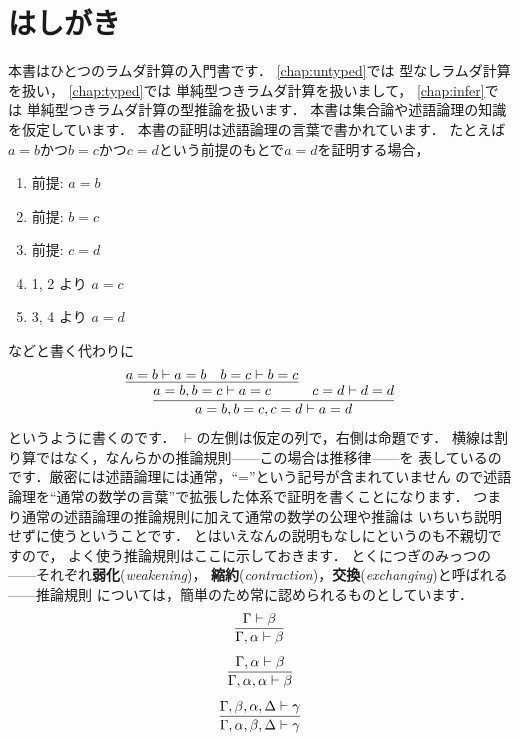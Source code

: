 \documentclass{ltjsbook}%
\newcommand\term[2]{\textbf{#1}{(\textit{#2})}}%
\begin{document}
\chapter{はしがき}%
\hspace*{1\zw}本書はひとつのラムダ計算の入門書です．%
\prechaptername\ref{chap:untyped}\postchaptername では%
型なしラムダ計算を扱い， \prechaptername\ref{chap:typed}\postchaptername では%
単純型つきラムダ計算を扱いまして，%
\prechaptername\ref{chap:infer}\postchaptername では%
単純型つきラムダ計算の型推論を扱います．%
\iffalse%
本書は集合論や述語論理の知識を仮定しています．%
本書の証明は述語論理の言葉で書かれています．%
たとえば$a=b$かつ$b=c$かつ$c=d$という前提のもとで$a=d$を証明する場合，%
\begin{enumerate}%
\item 前提: $a=b$
\item 前提: $b=c$
\item 前提: $c=d$
\item 1, 2 より $a=c$
\item 3, 4 より $a=d$
\end{enumerate}%
などと書く代わりに%
\begin{equation}%
  \infer{%
    a=b,b=c,c=d\vdash a=d%
  }{%
    \infer{%
      a=b,b=c\vdash a=c%
    }{%
      a=b\vdash a=b%
    &%
      b=c\vdash b=c%
    }%
  &%
    c=d\vdash d=d%
  }%
\end{equation}%
というように書くのです．%
$\vdash$の左側は仮定の列で，右側は命題です．%
横線は割り算ではなく，なんらかの推論規則------この場合は推移律------を%
表しているのです．厳密には述語論理には通常，``=''という記号が含まれていません%
ので述語論理を``通常の数学の言葉''で拡張した体系で証明を書くことになります．%
つまり通常の述語論理の推論規則に加えて通常の数学の公理や推論は%
いちいち説明せずに使うということです．%
とはいえなんの説明もなしにというのも不親切ですので，%
よく使う推論規則はここに示しておきます．%
とくにつぎのみっつの------それぞれ\term{弱化}{weakening}，%
\term{縮約}{contraction}，\term{交換}{exchanging}と呼ばれる------推論規則%
については，簡単のため常に認められるものとしています．%
\begin{equation}%
  \infer{%
    \Gamma,\alpha\vdash \beta%
  }{%
    \Gamma\vdash\beta%
  }%
\end{equation}%
\begin{equation}%
  \infer{%
    \Gamma,\alpha,\alpha\vdash\beta%
  }{%
    \Gamma,\alpha\vdash\beta%
  }%
\end{equation}%
\begin{equation}%
  \infer{%
    \Gamma,\alpha,\beta,\Delta\vdash \gamma%
  }{%
    \Gamma,\beta,\alpha,\Delta\vdash \gamma%
  }%
\end{equation}%
\end{document}
